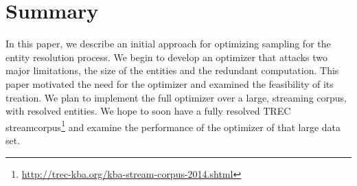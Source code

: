 

\section{Summary}

In this paper, we describe an initial approach for optimizing sampling for the entity resolution process.
We begin to develop an optimizer that attacks two major limitations, the size of the entities and the redundant computation.
This paper motivated the need for the optimizer and examined the feasibility of its treation.
We plan to implement the full optimizer over a large, streaming corpus, with resolved entities.
We hope to soon have a fully resolved TREC streamcorpus\footnote{\url{http://trec-kba.org/kba-stream-corpus-2014.shtml}} and examine the performance of the optimizer of that large data set.

